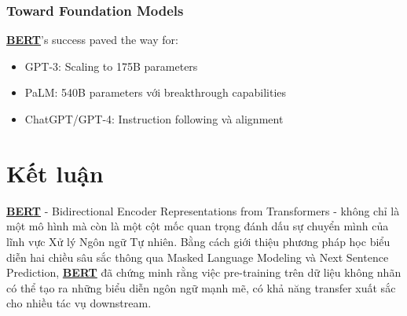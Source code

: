    \subsubsection{Toward Foundation Models}
    \hyperref[acro:bert]{\textbf{BERT}}'s success paved the way for:
    \begin{itemize}
        \item GPT-3: Scaling to 175B parameters
        \item PaLM: 540B parameters với breakthrough capabilities
        \item ChatGPT/GPT-4: Instruction following và alignment
    \end{itemize}
    
    \section{Kết luận}
    \label{sec:ket_luan}
    
    \hyperref[acro:bert]{\textbf{BERT}} - Bidirectional Encoder Representations from Transformers \cite{devlin2018bert} - không chỉ là một mô hình mà còn là một cột mốc quan trọng đánh dấu sự chuyển mình của lĩnh vực Xử lý Ngôn ngữ Tự nhiên. Bằng cách giới thiệu phương pháp học biểu diễn hai chiều sâu sắc thông qua Masked Language Modeling và Next Sentence Prediction, \hyperref[acro:bert]{\textbf{BERT}} đã chứng minh rằng việc pre-training trên dữ liệu không nhãn có thể tạo ra những biểu diễn ngôn ngữ mạnh mẽ, có khả năng transfer xuất sắc cho nhiều tác vụ downstream.
    
